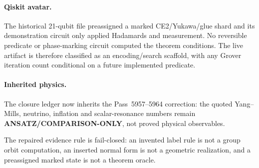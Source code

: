 \paragraph{Qiskit avatar.}
The historical 21-qubit file preassigned a marked CE2/Yukawa/glue shard and its
demonstration circuit only applied Hadamards and measurement.  No reversible
predicate or phase-marking circuit computed the theorem conditions.  The live
artifact is therefore classified as an encoding/search scaffold, with any
Grover iteration count conditional on a future implemented predicate.

\paragraph{Inherited physics.}
The closure ledger now inherits the Pass~5957--5964 correction: the quoted
Yang--Mills, neutrino, inflation and scalar-resonance numbers remain
\textbf{ANSATZ/COMPARISON-ONLY}, not proved physical observables.

The repaired evidence rule is fail-closed: an invented label rule is not a group
orbit computation, an inserted normal form is not a geometric realization, and
a preassigned marked state is not a theorem oracle.
